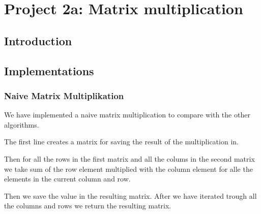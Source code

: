 
\chapter{Project 2a: Matrix multiplication} %

\label{Chapter2} %




\section{Introduction}



\section{Implementations \citep{matrixMultiplication}}


\subsection{Naive Matrix Multiplikation}
We have implemented a naive matrix multiplication to compare with the other algorithms.

The first line creates a matrix for saving the result of the multiplication in.

Then for all the rows in the first matrix and all the colums in the second matrix we take sum of the row element multiplied with the column element for alle the elements in the current column and row.

Then we save the value in the resulting matrix.
After we have iterated trough all the columns and rows we return the resulting matrix.


